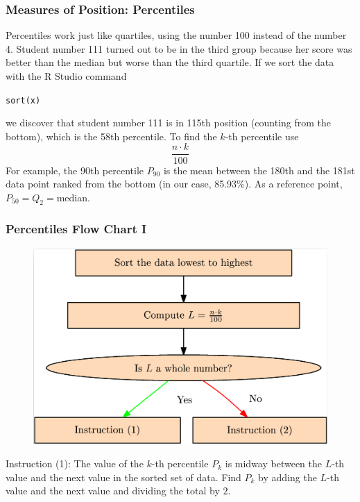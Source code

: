 \documentclass[xcolor=dvipsnames]{beamer}
\begin{document}
\begin{frame}
  \frametitle{Measures of Position: Percentiles}
Percentiles work just like quartiles, using the number 100 instead of
the number 4. Student number 111 turned out to be in the third
group because her score was better than the median but worse than the
third quartile. If we sort the data with the R Studio command
\begin{alltt}
sort(x)
\end{alltt}
we discover that student number 111 is in 115th position (counting
from the bottom), which is the 58th percentile. To find the $k$-th
percentile use
\begin{equation}
  \label{eq:phaecoab}
  \frac{n\cdot{}k}{100}
\end{equation}
For example, the 90th percentile $P_{90}$ is the mean between the 180th and the
181st data point ranked from the bottom (in our case, 85.93\%). As a
reference point, $P_{50}=Q_{2}=$median.
\end{frame}

\begin{frame}
  \frametitle{Percentiles Flow Chart I}
\begin{figure}[h]
\includegraphics[scale=.15]{./diagrams/percentile.png}
\end{figure}
Instruction (1): The value of the $k$-th percentile $P_{k}$ is midway
between the $L$-th value and the next value in the sorted set of data.
Find $P_{k}$ by adding the $L$-th value and the next value and
dividing the total by $2$.
\end{frame}
\end{document}
